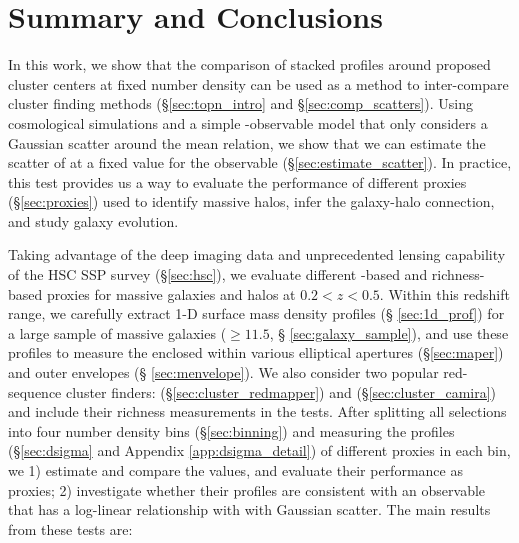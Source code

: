 \documentclass[fleqn,usenatbib,useAMS,english]{mnras}
\begin{document}
\section{Summary and Conclusions}
    \label{sec:summary}

    In this work, we show that the comparison of stacked \dsigma{} profiles around proposed
    cluster centers at fixed number density can be used as a method to inter-compare cluster
    finding methods (\S \ref{sec:topn_intro} and \S \ref{sec:comp_scatters}).
    Using cosmological simulations and a simple \mvir{}-observable model that only
    considers a Gaussian scatter around the mean relation, we show that we can estimate the
    scatter of \mvir{} at a fixed value for the observable (\S \ref{sec:estimate_scatter}).
    In practice, this \topn{} test provides us a way to evaluate the performance of different
    \mvir{} proxies (\S \ref{sec:proxies}) used to identify massive halos, infer the
    galaxy-halo connection, and study galaxy evolution.

    Taking advantage of the deep imaging data and unprecedented lensing capability of the HSC
    SSP survey (\S \ref{sec:hsc}), we evaluate different \mstar{}-based and richness-based
    \mvir{} proxies for massive galaxies and halos at $0.2 < z < 0.5$.
    Within this redshift range, we carefully extract 1-D surface mass density profiles (\S
    \ref{sec:1d_prof}) for a large sample of massive galaxies ($\geq 11.5$, \S
    \ref{sec:galaxy_sample}), and use these profiles to measure the \mstar{} enclosed within
    various elliptical apertures (\S \ref{sec:maper}) and outer envelopes (\S
    \ref{sec:menvelope}).
    We also consider two popular red-sequence cluster finders: \redm{}
    (\S \ref{sec:cluster_redmapper}) and \camira{} (\S \ref{sec:cluster_camira}) and include
    their richness measurements in the \topn{} tests.
    After splitting all selections into four number density bins (\S \ref{sec:binning}) and
    measuring the \dsigma{} profiles (\S \ref{sec:dsigma} and Appendix \ref{app:dsigma_detail})
    of different proxies in each bin, we
    1) estimate and compare the \sigmvir{} values, and evaluate their performance as \mvir{}
    proxies;
    2) investigate whether their \dsigma{} profiles are consistent with an observable that has
    a log-linear relationship with \mvir{} with Gaussian scatter.
    The main results from these tests are:
\end{document}
